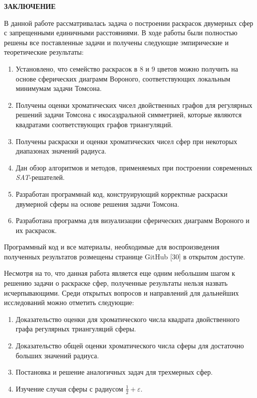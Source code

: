 \newpage
\begin{center}
\noindent\textbf{ЗАКЛЮЧЕНИЕ}\label{chapters:conclusions}
\vspace{1.5mm}
\end{center}

В данной работе рассматривалась задача о построении раскрасок двумерных сфер с запрещенными единичными расстояниями. 
В ходе работы были полностью решены все поставленные задачи и получены следующие эмпирические и теоретические результаты:

\begin{enumerate}

\item Установлено, что семейство раскрасок в $8$ и $9$ цветов можно получить на основе сферических диаграмм Вороного, соответствующих локальным минимумам задачи Томсона.  

\item Получены оценки хроматических чисел двойственных графов для регулярных решений задачи Томсона с икосаэдральной симметрией, которые являются квадратами соответствующих графов триангуляций.

\item Получены раскраски и оценки хроматических чисел сфер при некоторых диапазонах значений радиуса.

\item Дан обзор алгоритмов и методов, применяемых при построении современных \textit{SAT}-решателей.

\item Разработан программнай код, конструирующий корректные раскраски двумерной сферы на основе решения задачи Томсона.

\item Разработана программа для визуализации сферических диаграмм Вороного и их раскрасок.

\end{enumerate}

Программный код и все материалы, необходимые для воспроизведения полученных результатов розмещены странице GitHub [30] в открытом доступе.

Несмотря на то, что данная работа является еще одним небольшим шагом к решению задачи о раскраске сфер, полученные результаты нельзя назвать исчерпывающими. Среди открытых вопросов и направлений для дальнейших исследований можно отметить следующие:

\begin{enumerate}

\item Доказательство оценки для хроматического числа квадрата двойственного графа регулярных триангуляций сферы.
\item Доказательство общей оценки хроматического числа сферы для достаточно больших значений радиуса.
\item Постановка и решение аналогичных задач для трехмерных сфер.
\item Изучение случая сферы с радиусом $\frac{1}{2}+\varepsilon$.

\end{enumerate}
